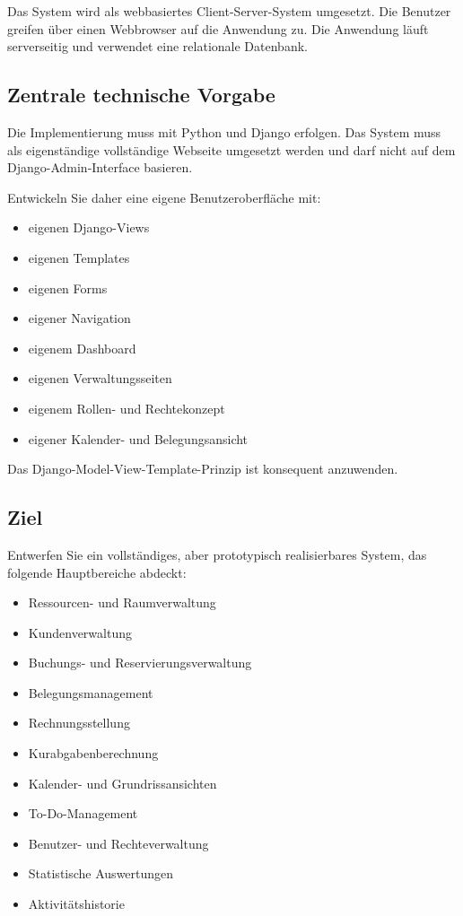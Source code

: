 Das System wird als webbasiertes Client-Server-System umgesetzt. Die Benutzer greifen über einen Webbrowser auf die Anwendung zu. Die Anwendung läuft serverseitig und verwendet eine relationale Datenbank.

\subsection{Zentrale technische Vorgabe}

Die Implementierung muss mit Python und Django erfolgen. Das System muss als eigenständige vollständige Webseite umgesetzt werden und darf nicht auf dem Django-Admin-Interface basieren.

Entwickeln Sie daher eine eigene Benutzeroberfläche mit:

\begin{itemize}
\item eigenen Django-Views
\item eigenen Templates
\item eigenen Forms
\item eigener Navigation
\item eigenem Dashboard
\item eigenen Verwaltungsseiten
\item eigenem Rollen- und Rechtekonzept
\item eigener Kalender- und Belegungsansicht
\end{itemize}

Das Django-Model-View-Template-Prinzip ist konsequent anzuwenden.

\subsection{Ziel}

Entwerfen Sie ein vollständiges, aber prototypisch realisierbares System, das folgende Hauptbereiche abdeckt:

\begin{itemize}
\item Ressourcen- und Raumverwaltung
\item Kundenverwaltung
\item Buchungs- und Reservierungsverwaltung
\item Belegungsmanagement
\item Rechnungsstellung
\item Kurabgabenberechnung
\item Kalender- und Grundrissansichten
\item To-Do-Management
\item Benutzer- und Rechteverwaltung
\item Statistische Auswertungen
\item Aktivitätshistorie
\end{itemize}

